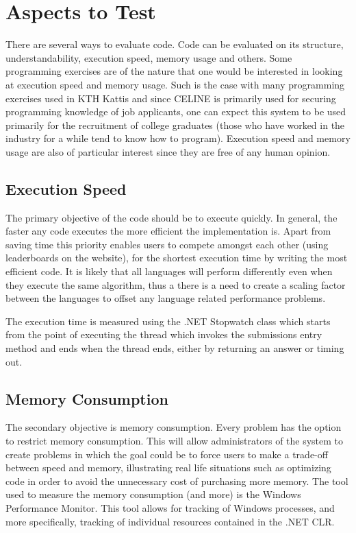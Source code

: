 \section{Aspects to Test}
There are several ways to evaluate code. Code can be evaluated on its structure, understandability, execution speed, memory usage and others. Some programming exercises are of the nature that one would be interested in looking at execution speed and memory usage. Such is the case with many programming exercises used in KTH Kattis \cite{Kattis} and since CELINE is primarily used for securing programming knowledge of job applicants, one can expect this system to be used primarily for the recruitment of college graduates (those who have worked in the industry for a while tend to know how to program). Execution speed and memory usage are also of particular interest since they are free of any human opinion.


\subsection{Execution Speed}
The primary objective of the code should be to execute quickly. In general, the faster any code executes the more efficient the implementation is. Apart from saving time this priority enables users to compete amongst each other (using leaderboards on the website), for the shortest execution time by writing the most efficient code. It is likely that all languages will perform differently even when they execute the same algorithm, thus a there is a need to create a scaling factor between the languages to offset any language related performance problems.

The execution time is measured using the .NET Stopwatch class \cite{Stopwatch} which starts from the point of executing the thread which invokes the submissions entry method and ends when the thread ends, either by returning an answer or timing out.


\subsection{Memory Consumption}
The secondary objective is memory consumption. Every problem has the option to restrict memory consumption. This will allow administrators of the system to create problems in which the goal could be to force users to make a trade-off between speed and memory, illustrating real life situations such as optimizing code in order to avoid the unnecessary cost of purchasing more memory.
The tool used to measure the memory consumption (and more) is the Windows Performance Monitor. This tool allows for tracking of Windows processes, and more specifically, tracking of individual resources contained in the .NET CLR.
